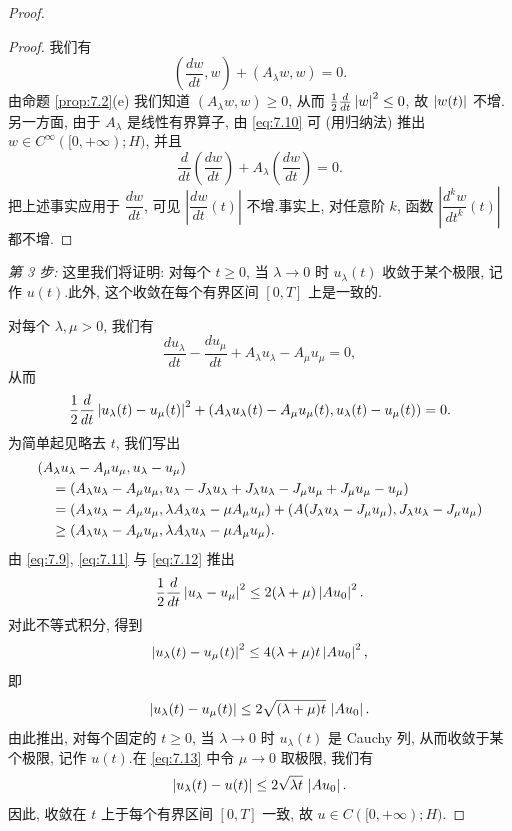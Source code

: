 \begin{proof}
\begin{proof}
我们有
\begin{equation*}
\left(\frac{dw}{dt},w\right)+(A_\lambda w,w)=0.
\end{equation*}
由命题  \ref{prop:7.2}(e) 我们知道 $(A_\lambda w,w)\ge0$, 从而
$\frac12\frac{d}{dt}\left|w\right|^2\le0$, 故 $\left|w(t)\right|$ 不增.另一方面, 由于
$A_\lambda$ 是线性有界算子, 由 \eqref{eq:7.10} 可 (用归纳法) 推出
$w\in C^\infty([0,+\infty);H)$, 并且
\begin{equation*}
\frac{d}{dt}\left(\frac{dw}{dt}\right)
+A_\lambda\left(\frac{dw}{dt}\right)=0.
\end{equation*}
把上述事实应用于 $\dfrac{dw}{dt}$, 可见
$\left|\dfrac{dw}{dt}(t)\right|$ 不增.事实上, 对任意阶 $k$, 函数
$\left|\dfrac{d^kw}{dt^k}(t)\right|$ 都不增.
\end{proof}

\emph{第 3 步:} 这里我们将证明: 对每个 $t\ge0$, 当 $\lambda\to0$ 时
$u_\lambda(t)$ 收敛于某个极限, 记作 $u(t)$.此外, 这个收敛在每个有界区间
$[0,T]$ 上是一致的.

对每个 $\lambda,\mu>0$, 我们有
\begin{equation*}
\frac{du_\lambda}{dt}-\frac{du_\mu}{dt}
+A_\lambda u_\lambda-A_\mu u_\mu=0,
\end{equation*}
从而
\begin{equation}
\frac12\frac{d}{dt}\left|u_\lambda(t)-u_\mu(t)\right|^2
+(A_\lambda u_\lambda(t)-A_\mu u_\mu(t),u_\lambda(t)-u_\mu(t))=0.
\label{eq:7.11}
\end{equation}
为简单起见略去 $t$, 我们写出
\begin{align}
&(A_\lambda u_\lambda-A_\mu u_\mu,u_\lambda-u_\mu)\notag\\
&\quad=(A_\lambda u_\lambda-A_\mu u_\mu,
u_\lambda-J_\lambda u_\lambda+J_\lambda u_\lambda
-J_\mu u_\mu+J_\mu u_\mu-u_\mu)\notag\\
&\quad=(A_\lambda u_\lambda-A_\mu u_\mu,\lambda A_\lambda u_\lambda
-\mu A_\mu u_\mu)+(A(J_\lambda u_\lambda-J_\mu u_\mu),
J_\lambda u_\lambda-J_\mu u_\mu)\notag\\
&\quad\ge(A_\lambda u_\lambda-A_\mu u_\mu,\lambda A_\lambda u_\lambda
-\mu A_\mu u_\mu).
\label{eq:7.12}
\end{align}
由 \eqref{eq:7.9}, \eqref{eq:7.11} 与 \eqref{eq:7.12} 推出
\begin{equation*}
\frac12\frac{d}{dt}\left|u_\lambda-u_\mu\right|^2
\le2(\lambda+\mu)\left|Au_0\right|^2.
\end{equation*}
对此不等式积分, 得到
\begin{equation*}
\left|u_\lambda(t)-u_\mu(t)\right|^2\le4(\lambda+\mu)t\left|Au_0\right|^2,
\end{equation*}
即
\begin{equation}
\left|u_\lambda(t)-u_\mu(t)\right|\le2\sqrt{(\lambda+\mu)t}\,\left|Au_0\right|.
\label{eq:7.13}
\end{equation}
由此推出, 对每个固定的 $t\ge0$, 当 $\lambda\to0$ 时 $u_\lambda(t)$ 是
Cauchy 列, 从而收敛于某个极限, 记作 $u(t)$.在 \eqref{eq:7.13} 中令
$\mu\to0$ 取极限, 我们有
\begin{equation*}
\left|u_\lambda(t)-u(t)\right|\le2\sqrt{\lambda t}\,\left|Au_0\right|.
\end{equation*}
因此, 收敛在 $t$ 上于每个有界区间 $[0,T]$ 一致, 故
$u\in C([0,+\infty);H)$.


\end{proof}
